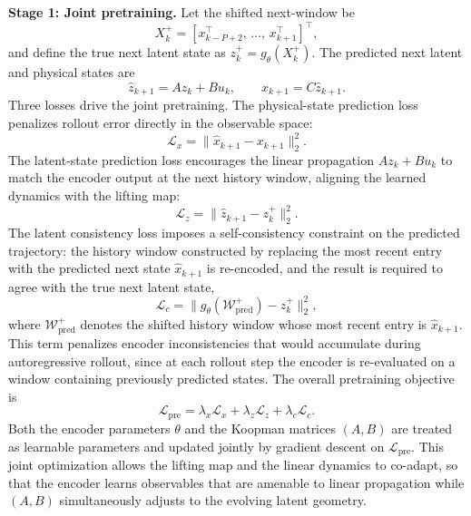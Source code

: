 \documentclass[journal]{IEEEtran}
\begin{document}
\textbf{Stage 1: Joint pretraining.}
Let the shifted next-window be
\begin{equation}
    X_k^{+} = [x_{k-P+2}^\top,\,\ldots,\,x_{k+1}^\top]^\top,
\end{equation}
and define the true next latent state as $z_k^{+} = g_\theta(X_k^{+})$.
The predicted next latent and physical states are
\begin{equation}
    \hat{z}_{k+1} = Az_k + Bu_k,
    \qquad
    \hat{x}_{k+1} = C\hat{z}_{k+1}.
\end{equation}
Three losses drive the joint pretraining. The physical-state prediction loss penalizes rollout error directly in the observable space:
\begin{equation}
    \mathcal{L}_{x} = \|\hat{x}_{k+1}-x_{k+1}\|_2^2.
    \label{eq:loss_x}
\end{equation}
The latent-state prediction loss encourages the linear propagation $Az_k+Bu_k$ to match the encoder output at the next history window, aligning the learned dynamics with the lifting map:
\begin{equation}
    \mathcal{L}_{z} = \|\hat{z}_{k+1}-z_k^{+}\|_2^2.
    \label{eq:loss_z}
\end{equation}
The latent consistency loss imposes a self-consistency constraint on the predicted trajectory: the history window constructed by replacing the most recent entry with the predicted next state $\hat{x}_{k+1}$ is re-encoded, and the result is required to agree with the true next latent state,
\begin{equation}
    \mathcal{L}_{c} = \bigl\|g_\theta\!\left(\mathcal{W}^{+}_{\mathrm{pred}}\right)-z_k^{+}\bigr\|_2^2,
    \label{eq:loss_c}
\end{equation}
where $\mathcal{W}^{+}_{\mathrm{pred}}$ denotes the shifted history window whose most recent entry is $\hat{x}_{k+1}$. This term penalizes encoder inconsistencies that would accumulate during autoregressive rollout, since at each rollout step the encoder is re-evaluated on a window containing previously predicted states. The overall pretraining objective is
\begin{equation}
    \mathcal{L}_{\mathrm{pre}} = \lambda_x\mathcal{L}_x + \lambda_z\mathcal{L}_z + \lambda_c\mathcal{L}_c.
    \label{eq:pretraining_loss}
\end{equation}
Both the encoder parameters $\theta$ and the Koopman matrices $(A,B)$ are treated as learnable parameters and updated jointly by gradient descent on $\mathcal{L}_{\mathrm{pre}}$. This joint optimization allows the lifting map and the linear dynamics to co-adapt, so that the encoder learns observables that are amenable to linear propagation while $(A,B)$ simultaneously adjusts to the evolving latent geometry.
\end{document}
